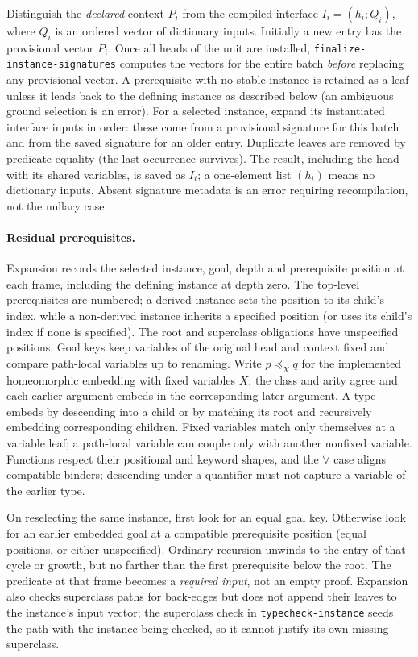 \documentclass[11pt]{article}
\theoremstyle{definition}
\newcommand{\src}[1]{\nolinkurl{#1}}
\begin{document}
Distinguish the \emph{declared} context $P_i$ from the compiled interface
$I_i=(h_i;Q_i)$, where $Q_i$ is an ordered vector of dictionary inputs.
Initially a new entry has the provisional vector $P_i$. Once all heads
of the unit are installed, \src{finalize-instance-signatures} computes
the vectors for the entire batch \emph{before} replacing any provisional
vector. A prerequisite with no stable instance is retained as a leaf
unless it leads back to the defining instance as described below
(an ambiguous ground selection is an error). For a selected
instance, expand its instantiated interface inputs in order: these come
from a provisional signature for this batch and from the saved signature
for an older entry. Duplicate leaves are removed by predicate equality
(the last occurrence survives). The result, including the head with its shared variables, is
saved as $I_i$; a one-element list $(h_i)$ means no dictionary inputs.
Absent signature metadata is an error requiring recompilation, not the
nullary case.

\paragraph{Residual prerequisites.}
Expansion records the selected instance, goal, depth and prerequisite
position at each frame, including the defining instance at depth zero.
The top-level prerequisites are numbered; a derived instance sets the
position to its child's index, while a non-derived instance inherits a
specified position (or uses its child's index if none is specified).
The root and superclass obligations have unspecified positions.
Goal keys keep variables of the original head and context fixed and compare
path-local variables up to renaming. Write $p\preceq_X q$ for the
implemented homeomorphic embedding with fixed variables $X$: the class
and arity agree and each earlier argument embeds in the corresponding
later argument. A type embeds by descending into a child or by matching
its root and recursively embedding corresponding children. Fixed variables
match only themselves at a variable leaf; a path-local variable can couple
only with another nonfixed variable. Functions respect their positional
and keyword shapes, and the $\forall$ case aligns compatible binders;
descending under a quantifier must not capture a variable of the earlier type.

On reselecting the same instance, first look for an equal goal key. Otherwise
look for an earlier embedded goal at a compatible prerequisite position
(equal positions, or either unspecified). Ordinary recursion unwinds to the
entry of that cycle or growth, but no farther than the first prerequisite
below the root. The predicate at that frame becomes a \emph{required input},
not an empty proof. Expansion also checks superclass paths for back-edges
but does not append their leaves to the instance's input vector;
the superclass check in \src{typecheck-instance} seeds the path with the
instance being checked, so it cannot justify its own missing superclass.
\end{document}
